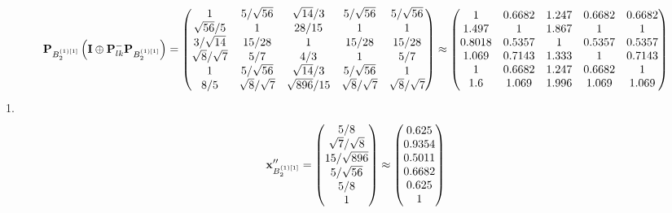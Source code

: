 \documentclass[10pt,a4paper]{article}
\begin{document}
	\[
		\bold{P}_{B_2^{(1)[1]}}\left(\bold{I} \oplus \bold{P}_{lk}^{-}\bold{P}_{B_2^{(1)[1]}}\right) = 
		\begin{pmatrix}
			{1}{} & {{5}} / {\sqrt{56}} & {\sqrt{14}} / {{3}} & {{5}} / {\sqrt{56}} & {{5}} / {\sqrt{56}} \\
			{\sqrt{56}} / {{5}} & {1}{} & {{28}} / {{15}} & {1}{} & {1}{} \\
			{{3}} / {\sqrt{14}} & {{15}} / {{28}} & {1}{} & {{15}} / {{28}} & {{15}} / {{28}} \\
			{\sqrt{8}} / {\sqrt{7}} & {{5}} / {{7}} & {{4}} / {{3}} & {1}{} & {{5}} / {{7}} \\
			{1}{} & {{5}} / {\sqrt{56}} & {\sqrt{14}} / {{3}} & {{5}} / {\sqrt{56}} & {1}{} \\
			{{8}} / {{5}} & {\sqrt{8}} / {\sqrt{7}} & {\sqrt{896}} / {{15}} & {\sqrt{8}} / {\sqrt{7}} & {\sqrt{8}} / {\sqrt{7}} \\
		\end{pmatrix}
		\approx
		\begin{pmatrix}
			1        & 0.6682   & 1.247    & 0.6682   & 0.6682   \\
			1.497    & 1        & 1.867    & 1        & 1        \\
			0.8018   & 0.5357   & 1        & 0.5357   & 0.5357   \\
			1.069    & 0.7143   & 1.333    & 1        & 0.7143   \\
			1        & 0.6682   & 1.247    & 0.6682   & 1        \\
			1.6      & 1.069    & 1.996    & 1.069    & 1.069    \\
		\end{pmatrix}
	\]
	1.
	\[
		\bold{x}''_{B_2^{(1)[1]}} = 
		\begin{pmatrix}
			{{5}} / {{8}} \\
			{\sqrt{7}} / {\sqrt{8}} \\
			{{15}} / {\sqrt{896}} \\
			{{5}} / {\sqrt{56}} \\
			{{5}} / {{8}} \\
			{1}{} \\
		\end{pmatrix}
		\approx
		\begin{pmatrix}
			0.625    \\
			0.9354   \\
			0.5011   \\
			0.6682   \\
			0.625    \\
			1        \\
		\end{pmatrix}
	\]
\end{document}

